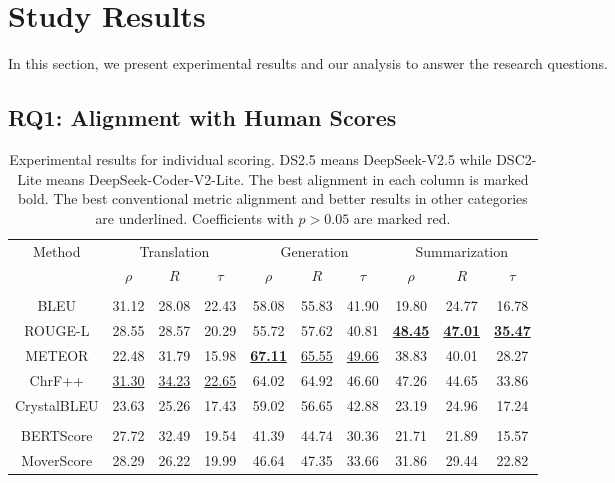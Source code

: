 \section{Study Results\label{result}}
In this section, we present experimental results and our analysis to answer the research questions.

\subsection{RQ1: Alignment with Human Scores}
\begin{table}[]
    \centering
    \caption{Experimental results for individual scoring. DS2.5 means DeepSeek-V2.5 while DSC2-Lite means DeepSeek-Coder-V2-Lite. The best alignment in each column is marked bold. The best conventional metric alignment and better results in other categories are underlined. Coefficients with \(p>0.05\) are marked red.}
    \vspace{-1.0em}
    \begin{tabular}{c|ccc|ccc|ccc}
         \toprule
         \multirow{2}{*}{Method} & \multicolumn{3}{c|}{Translation} & \multicolumn{3}{c|}{Generation} & \multicolumn{3}{c}{Summarization} \\

         & \(\rho\) & \(R\) & \(\tau\) & \(\rho\) & \(R\) & \(\tau\) & \(\rho\) & \(R\) & \(\tau\) \\ \midrule

         \rowcolor{gray!40} \multicolumn{10}{c}{\textbf{Conventional Metrics}} \\ \midrule
BLEU        & 31.12 & 28.08 & 22.43 & 58.08 & 55.83 & 41.90 & 19.80 &  24.77 &  16.78 \\
ROUGE-L       & 28.55 & 28.57 & 20.29 & 55.72 & 57.62 & 40.81 & \underline{\textbf{48.45}} &  \underline{\textbf{47.01}} &  \underline{\textbf{35.47}} \\
METEOR      & 22.48 & 31.79 & 15.98 & \underline{\textbf{67.11}} & \underline{65.55} & \underline{49.66} & 38.83 &  40.01 &  28.27 \\
ChrF++        & \underline{31.30} & \underline{34.23} & \underline{22.65} & 64.02 & 64.92 & 46.60 & 47.26 &  44.65 &  33.86 \\
CrystalBLEU & 23.63 & 25.26 & 17.43 & 59.02 & 56.65 & 42.88 & 23.19 &  24.96 &  17.24 \\ \midrule

         \rowcolor{gray!40}\multicolumn{10}{c}{\textbf{Embedding-based}} \\ \midrule
BERTScore   & 27.72 & 32.49 & 19.54 & 41.39 & 44.74 & 30.36 & 21.71 &  21.89 &  15.57 \\
MoverScore  & 28.29 & 26.22 & 19.99 & 46.64 & 47.35 & 33.66 & 31.86 &  29.44 &  22.82 \\ \midrule


\end{tabular}
\end{table}
